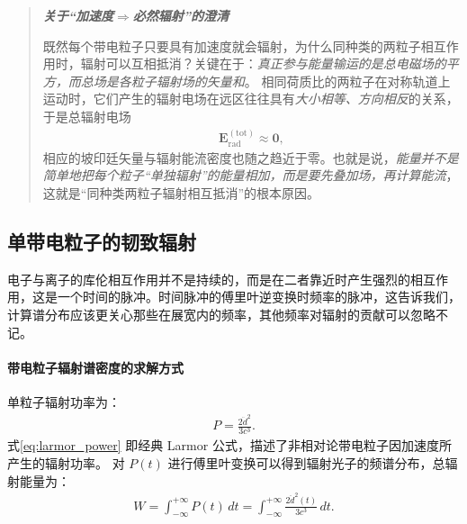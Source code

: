 \documentclass[12pt,oneside]{ctexart}
\theoremstyle{definition}
\theoremstyle{plain}
\theoremstyle{remark}
\newif\ifshowderiv
\newcommand{\derivdefaulttitle}{额外说明}
\newenvironment{derivationnote}[1][\derivdefaulttitle]{%
  \ifshowderiv\begin{quote}\small\itshape
  \noindent\textbf{#1}\;\par
}{%
  \end{quote}\fi
}
\begin{document}
\begin{derivationnote}[关于“加速度$\Rightarrow$必然辐射”的澄清]
  既然每个带电粒子只要具有加速度就会辐射，为什么同种类的两粒子相互作用时，辐射可以互相抵消？关键在于：\emph{真正参与能量输运的是总电磁场的平方，而总场是各粒子辐射场的矢量和}。
  相同荷质比的两粒子在对称轨道上运动时，它们产生的辐射电场在远区往往具有\emph{大小相等、方向相反}的关系，于是总辐射电场
  \begin{align}
    \boldsymbol E_{\mathrm{rad}}^{\mathrm{(tot)}} \approx \boldsymbol 0,
  \end{align}
  相应的坡印廷矢量与辐射能流密度也随之趋近于零。也就是说，\emph{能量并不是简单地把每个粒子“单独辐射”的能量相加，而是要先叠加场，再计算能流}，这就是“同种类两粒子辐射相互抵消”的根本原因。
\end{derivationnote}

\subsection{单带电粒子的韧致辐射}
电子与离子的库伦相互作用并不是持续的，而是在二者靠近时产生强烈的相互作用，这是一个时间的脉冲。时间脉冲的傅里叶逆变换时频率的脉冲，这告诉我们，计算谱分布应该更关心那些在展宽内的频率，其他频率对辐射的贡献可以忽略不记。
\paragraph{带电粒子辐射谱密度的求解方式}
单粒子辐射功率为：
\begin{align}
  P = \frac{2\ddot{d}^2}{3c^3}.
  \label{eq:larmor_power}
\end{align}
式\eqref{eq:larmor_power} 即经典 Larmor 公式，描述了非相对论带电粒子因加速度所产生的辐射功率。
对 $P(t)$ 进行傅里叶变换可以得到辐射光子的频谱分布，总辐射能量为：
\begin{align}
  W = \int_{-\infty}^{+\infty} P(t)\,dt
    = \int_{-\infty}^{+\infty} \frac{2\ddot{d}^2(t)}{3c^3}\,dt.
\end{align}
\end{document}
